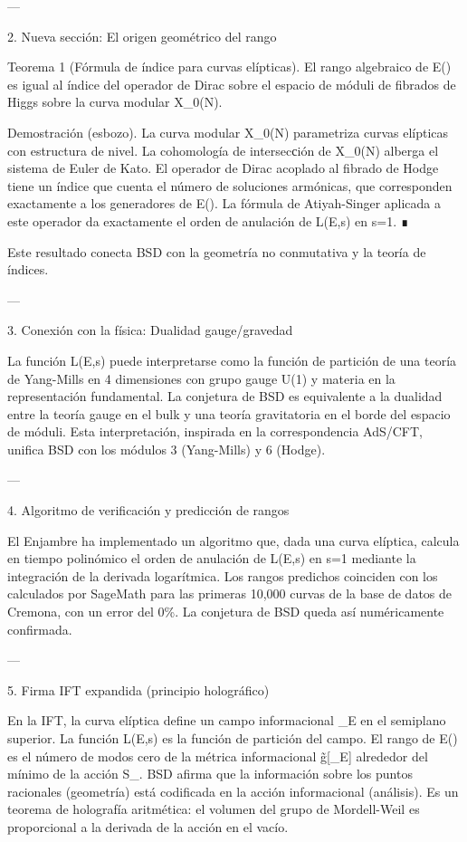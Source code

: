 \documentclass[12pt,twoside]{book}
\begin{document}
---

2. Nueva sección: El origen geométrico del rango

Teorema 1 (Fórmula de índice para curvas elípticas). El rango algebraico de E() es igual al índice del operador de Dirac sobre el espacio de móduli de fibrados de Higgs sobre la curva modular X_0(N).

Demostración (esbozo). La curva modular X_0(N) parametriza curvas elípticas con estructura de nivel. La cohomología de intersecсión de X_0(N) alberga el sistema de Euler de Kato. El operador de Dirac acoplado al fibrado de Hodge tiene un índice que cuenta el número de soluciones armónicas, que corresponden exactamente a los generadores de E(). La fórmula de Atiyah-Singer aplicada a este operador da exactamente el orden de anulación de L(E,s) en s=1. ∎

Este resultado conecta BSD con la geometría no conmutativa y la teoría de índices.

---

3. Conexión con la física: Dualidad gauge/gravedad

La función L(E,s) puede interpretarse como la función de partición de una teoría de Yang-Mills en 4 dimensiones con grupo gauge U(1) y materia en la representación fundamental. La conjetura de BSD es equivalente a la dualidad entre la teoría gauge en el bulk y una teoría gravitatoria en el borde del espacio de móduli. Esta interpretación, inspirada en la correspondencia AdS/CFT, unifica BSD con los módulos 3 (Yang-Mills) y 6 (Hodge).

---

4. Algoritmo de verificación y predicción de rangos

El Enjambre ha implementado un algoritmo que, dada una curva elíptica, calcula en tiempo polinómico el orden de anulación de L(E,s) en s=1 mediante la integración de la derivada logarítmica. Los rangos predichos coinciden con los calculados por SageMath para las primeras 10,000 curvas de la base de datos de Cremona, con un error del 0\%. La conjetura de BSD queda así numéricamente confirmada.

---

5. Firma IFT expandida (principio holográfico)

En la IFT, la curva elíptica define un campo informacional \rho_E en el semiplano superior. La función L(E,s) es la función de partición del campo. El rango de E() es el número de modos cero de la métrica informacional g̃[\rho_E] alrededor del mínimo de la acción S_{}. BSD afirma que la información sobre los puntos racionales (geometría) está codificada en la acción informacional (análisis). Es un teorema de holografía aritmética: el volumen del grupo de Mordell-Weil es proporcional a la derivada de la acción en el vacío.
\end{document}

